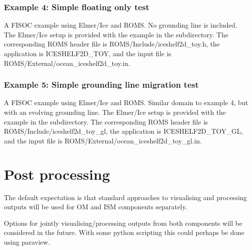 \documentclass[12pt]{article}
\begin{document}
\subsubsection{Example 4: Simple floating only test}
A FISOC example using Elmer/Ice and ROMS. No grounding line is included. 
The Elmer/Ice setup is provided with the example in the subdirectory. 
The corresponding ROMS header file is ROMS/Include/iceshelf2d\_toy.h, 
the application is ICESHELF2D\_TOY, 
and the input file is ROMS/External/ocean\_iceshelf2d\_toy.in.

\subsubsection{Example 5: Simple grounding line migration test}
A FISOC example using Elmer/Ice and ROMS. Similar domain to 
example 4, but with an evolving grounding line.
The Elmer/Ice setup is provided with the example in the subdirectory. 
The corresponding ROMS header file is ROMS/Include/iceshelf2d\_toy\_gl, 
the application is ICESHELF2D\_TOY\_GL, 
and the input file is ROMS/External/ocean\_iceshelf2d\_toy\_gl.in.




\section{Post processing}

The default expectation is that standard approaches to visualising and 
processing outputs will be used for OM and ISM components separately. 


Options for jointly visualising/processing outputs from both components 
will be considered in the future. 
With some python scripting this could perhaps be done using paraview.



\end{document}
